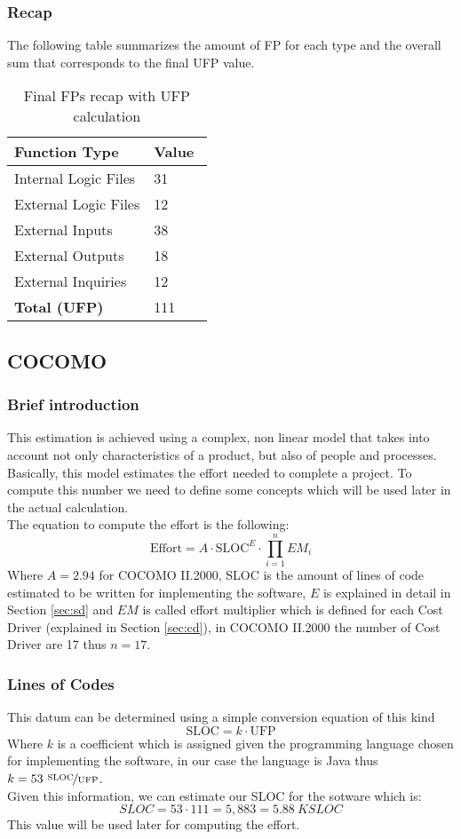 \subsubsection{Recap}
The following table summarizes the amount of FP for each type and the overall sum that corresponds to the final UFP value.
\begin{table}[H]
	\centering
	\begin{tabular}{p{0.7\linewidth}R{0.3\linewidth}}
		\hline
		\textbf{Function Type} & \textbf{Value} \\ \hline
		Internal Logic Files & 31 \\
		External Logic Files & 12 \\
		External Inputs & 38 \\
		External Outputs & 18 \\
		External Inquiries & 12 \\
		\textbf{Total (UFP)} & 111 \\
		\hline
	\end{tabular}
	\caption{Final FPs recap with UFP calculation}
\end{table}
\subsection{COCOMO}
\subsubsection{Brief introduction}
\label{sec:cocomo-int}
This estimation is achieved using a complex, non linear model that takes into account not only characteristics of a product, but also of people and processes. \\
Basically, this model estimates the effort needed to complete a project. To compute this number we need to define some concepts which will be used later in the actual calculation. \\
The equation to compute the effort is the following:
$$\textrm{Effort} = A \cdot \textrm{SLOC}^E \cdot \prod_{i=1}^{n} EM_i$$
Where $A = 2.94$ for COCOMO II.2000, SLOC is the amount of lines of code estimated to be written for implementing the software, $E$ is explained in detail in Section \ref{sec:sd} and $EM$ is called effort multiplier which is defined for each Cost Driver (explained in Section \ref{sec:cd}), in COCOMO II.2000 the number of Cost Driver are 17 thus $n = 17$.
\subsubsection{Lines of Codes}
This datum can be determined using a simple conversion equation of this kind
$$ \textrm{SLOC} = k \cdot \textrm{UFP} $$
Where $k$ is a coefficient which is assigned given the programming language chosen for implementing the software, in our case the language is Java thus $k = 53\ \nicefrac{\textrm{SLOC}}{\textrm{UFP}}$. \\
Given this information, we can estimate our SLOC for the sotware which is:
$$SLOC = 53 \cdot 111 = 5,883 = 5.88\ KSLOC$$
This value will be used later for computing the effort.
